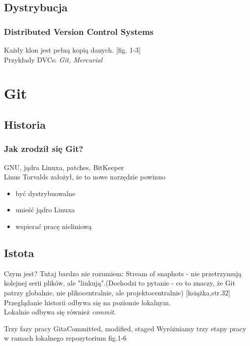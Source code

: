 \documentclass{beamer}
\begin{document}
\subsection{Dystrybucja}
\begin{frame}
 \frametitle{\textbf{D}istributed \textbf{V}ersion \textbf{C}ontrol \textbf{S}ystems}
  Każdy klon jest pełną kopią danych.
  [fig. 1-3]
  \\Przykłady DVCs: \textit{Git, Mercurial}
\end{frame}

\section{Git}
\subsection{Historia}
\begin{frame}
 \frametitle{Jak zrodził się Git?}
GNU, jądra Linuxa, patches, BitKeeper \\
Linus Torvalds założył, że to nowe narzędzie powinno \\
  \begin{itemize}
  \item być dystrybuowalne
  \item unieść jądro Linuxa
  \item wspierać pracę nieliniową
 \end{itemize}
\end{frame}

\subsection{Istota}
\begin{frame}{Czym jest?}
 Tutaj bardzo nie rozumiem:
 Stream of snaphots - nie przetrzymują kolejnej serii plików, ale "linkują".(Dochodzi to pytanie - co to znaczy, że Git patrzy globalnie, nie plikocentralnie, ale projektocentralnie)
 [książka,str.32]\\
 Przeglądanie historii odbywa się na poziomie lokalnym.\\
 Lokalnie odbywa się również \textit{commit}.\\
\end{frame}

\begin{frame}{Trzy fazy pracy Gita}{Committed, modified, staged}
 Wyróżniamy trzy etapy pracy w ramach lokalnego repozytorium
 fig.1-6
\end{frame}
\end{document}
